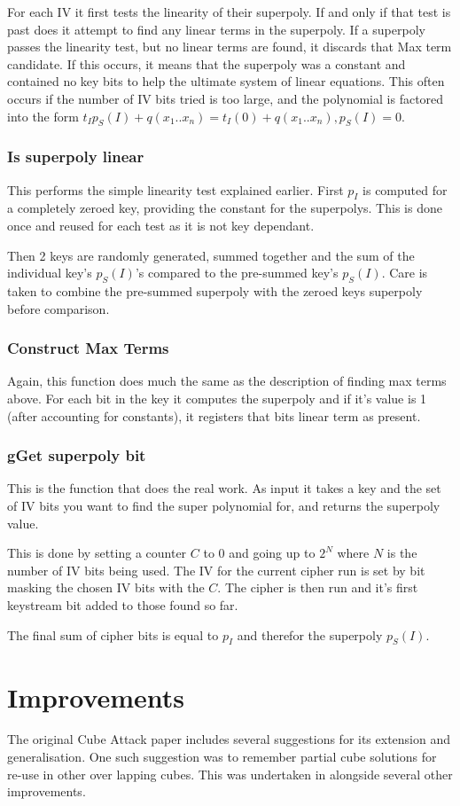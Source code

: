 \documentclass{report}
\let\Oldsection\section
\renewcommand{\section}{\FloatBarrier\Oldsection}
\let\Oldsubsubsection\subsubsection
\renewcommand{\subsubsection}{\FloatBarrier\Oldsubsubsection}
\begin{document}
For each IV it first tests the linearity of their superpoly. If and only if that test is past does it attempt to find any linear terms in the superpoly. If a superpoly passes the linearity test, but no linear terms are found, it discards that Max term candidate. If this occurs, it means that the superpoly was a constant and contained no key bits to help the ultimate system of linear equations. This often occurs if the number of IV bits tried is too large, and the polynomial is factored into the form $t_Ip_S(I)+q(x_1..x_n)=t_I(0)+q(x_1..x_n), p_S(I)=0$.

\subsubsection{Is superpoly linear}
This performs the simple linearity test explained earlier. First $p_I$ is computed for a completely zeroed key, providing the constant for the superpolys. This is done once and reused for each test as it is not key dependant.

Then 2 keys are randomly generated, summed together and the sum of the individual key's $p_S(I)$'s compared to the pre-summed key's $p_S(I)$. Care is taken to combine the pre-summed superpoly with the zeroed keys superpoly before comparison.
\subsubsection{Construct Max Terms}
Again, this function does much the same as the description of finding max terms above. For each bit in the key it computes the superpoly and if it's value is 1 (after accounting for constants), it registers that bits linear term as present.
\subsubsection{gGet superpoly bit}
This is the function that does the real work. As input it takes a key and the set of IV bits you want to find the super polynomial for, and returns the superpoly value.

This is done by setting a counter $C$ to 0 and going up to $2^N$ where $N$ is the number of IV bits being used. The IV for the current cipher run is set by bit masking the chosen IV bits with the $C$. The cipher is then run and it's first keystream bit added to those found so far.

The final sum of cipher bits is equal to $p_I$ and therefor the superpoly $p_S(I)$.
\section{Improvements}
The original Cube Attack paper includes several suggestions for its extension and generalisation. One such suggestion was to remember partial cube solutions for re-use in other over lapping cubes. This was undertaken in \cite{MobiusTransform} alongside several other improvements.
\end{document}
